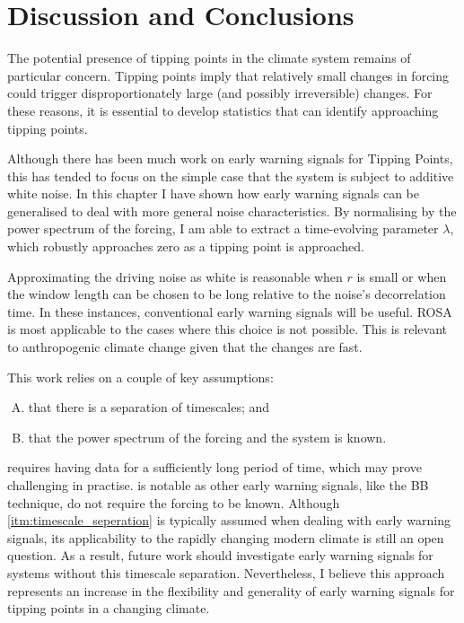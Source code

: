 \section{Discussion and Conclusions}
The potential presence of tipping points in the climate system remains of particular concern. 
Tipping points imply that relatively small changes in forcing could trigger
disproportionately large (and possibly irreversible) changes.
For these reasons, it is essential to develop
statistics that can identify approaching tipping points.

Although there has been much work on early warning signals for Tipping Points,
this has tended to focus on the simple case that the system is subject to additive white noise. 
In this chapter I have shown how early warning signals can be generalised to deal with more general noise characteristics. By normalising by the power spectrum of the forcing, I am able to extract a 
time-evolving parameter $\lambda$, which robustly approaches zero as a tipping point is approached.  

Approximating the driving noise as white is reasonable when $r$ is 
small or when the window length can be chosen to be long relative to the 
noise's decorrelation time. In these instances, conventional early warning signals will be useful. ROSA is most applicable to the cases where this choice is not
possible. This is relevant to anthropogenic climate change given that the changes are fast.

This work relies on a couple of  key assumptions:
\begin{enumerate}[A.]
\item \label{itm:timescale_seperation} that there is a separation of timescales; and
\item \label{itm:exists} that the power spectrum of the forcing and the system is known.
\end{enumerate}
 requires having data for a sufficiently long period of time, which may 
prove challenging in practise.  is notable as other early warning signals, like the BB technique, do not require the forcing to be known.
Although \cref{itm:timescale_seperation} is typically assumed when dealing with early warning signals, its applicability
to the rapidly changing modern climate is still an open question.
As a result, future work should investigate early warning signals for systems without this timescale separation.
Nevertheless, I believe this approach represents an increase in the flexibility and generality of early warning signals for tipping points in a changing climate.




